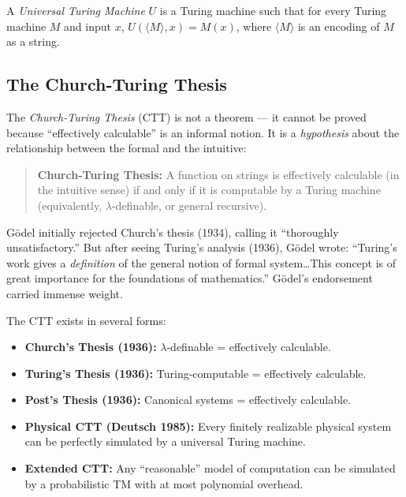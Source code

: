 \begin{definition}
A \emph{Universal Turing Machine} $U$ is a Turing machine such that for every Turing machine $M$ and input $x$, $U(\langle M \rangle, x) = M(x)$, where $\langle M \rangle$ is an encoding of $M$ as a string.
\end{definition}

\subsection{The Church-Turing Thesis}
\label{sec:computation:ctt}

The \emph{Church-Turing Thesis} (CTT) is not a theorem --- it cannot be proved because ``effectively calculable'' is an informal notion. It is a \emph{hypothesis} about the relationship between the formal and the intuitive:

\begin{quote}
\textbf{Church-Turing Thesis:} A function on strings is effectively calculable (in the intuitive sense) if and only if it is computable by a Turing machine (equivalently, $\lambda$-definable, or general recursive).
\end{quote}

\begin{historicalnote}
G\"odel initially rejected Church's thesis (1934), calling it ``thoroughly unsatisfactory.'' But after seeing Turing's analysis (1936), G\"odel wrote: ``Turing's work gives a \emph{definition} of the general notion of formal system\ldots This concept is of great importance for the foundations of mathematics.'' G\"odel's endorsement carried immense weight.
\end{historicalnote}

The CTT exists in several forms:
\begin{itemize}
\item \textbf{Church's Thesis (1936):} $\lambda$-definable = effectively calculable.
\item \textbf{Turing's Thesis (1936):} Turing-computable = effectively calculable.
\item \textbf{Post's Thesis (1936):} Canonical systems = effectively calculable.
\item \textbf{Physical CTT (Deutsch 1985):} Every finitely realizable physical system can be perfectly simulated by a universal Turing machine.
\item \textbf{Extended CTT:} Any ``reasonable'' model of computation can be simulated by a probabilistic TM with at most polynomial overhead.
\end{itemize}

